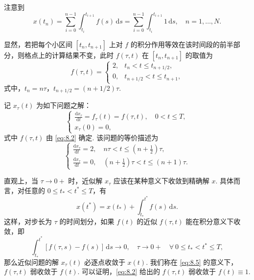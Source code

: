 注意到
\begin{equation*}
    x(t_n) = \sum_{i=0}^{n-1} \int_{t_i}^{t_{i+1}} f(s) \,\mathrm{d}s = \sum_{i=0}^{n-1} \int_{t_i}^{t_{i+1}} 1 \,\mathrm{d}s, \quad n = 1, \dots, N.
\end{equation*}

显然，若把每个小区间 $[t_n, t_{n+1}]$ 上对 $f$ 的积分作用等效在该时间段的前半部分，则格点上的计算结果不变，此时 $f(\tau, t)$ 在 $[t_n, t_{n+1}]$ 的取值为
\begin{equation}\label{eq:8.2}
    f(\tau, t) = \begin{cases}
        2, & t_n < t \leq t_{n+1/2}, \\
        0, & t_{n+1/2} < t \leq t_{n+1},
    \end{cases}
\end{equation}
式中，$t_n = n\tau$，$t_{n+1/2} = (n+1/2)\tau$.

记 $x_\tau(t)$ 为如下问题之解：
\begin{equation}\label{eq:8.3}
    \begin{cases}
        \frac{\mathrm{d}x_\tau}{\mathrm{d}t} = f_\tau(t) = f(\tau, t), \quad 0 < t \leq T, \\
        x_\tau(0) = 0,
    \end{cases}
\end{equation}
式中 $f(\tau, t)$ 由 \eqref{eq:8.2} 确定. 该问题的等价描述为
\begin{equation}\label{eq:8.4}
    \begin{cases}
        \frac{\mathrm{d}x_\tau}{\mathrm{d}t} = 2, \quad n\tau < t \leq (n+\frac{1}{2})\tau, \\[7pt]
        \frac{\mathrm{d}x_\tau}{\mathrm{d}t} = 0, \quad (n+\frac{1}{2})\tau < t \leq (n+1)\tau.
    \end{cases}
\end{equation}

直观上，当 $\tau \rightarrow 0+$ 时，近似解 $x_\tau$ 应该在某种意义下收敛到精确解 $x$. 具体而言，对任意的 $0 \leq t_* < t^* \leq T$，有
\begin{equation*}
    x(t^*) = x(t_*) + \int_{t_*}^{t^*} f(s) \,\mathrm{d}s.
\end{equation*}
这样，对步长为 $\tau$ 的时间划分，如果 $f(t)$ 的近似 $f(\tau, t)$ 能在积分意义下收敛，即
\begin{equation}\label{eq:8.5}
    \int_{t_*}^{t^*} [f(\tau, s) - f(s)] \,\mathrm{d}s \rightarrow 0, \quad \tau \rightarrow 0+ \quad \forall\ 0 \leq t_* < t^* \leq T,
\end{equation}
那么近似问题的解 $x_\tau(t)$ 必逐点收敛于 $x(t)$. 我们称在 \eqref{eq:8.5} 的意义下，$f(\tau, t)$ 弱收敛于 $f(t)$. 可以证明，\eqref{eq:8.2} 给出的 $f(\tau, t)$ 弱收敛于 $f(t) \equiv 1$.


